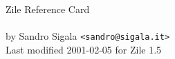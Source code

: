 \documentclass[10pt]{article}
\begin{document}
\pagestyle{empty}

\begin{center}
  \Large
  Zile Reference Card                                   \\
  \small\mbox{}                                         \\
  by Sandro Sigala \verb|<sandro@sigala.it>|            \\
  Last modified 2001-02-05 for Zile 1.5
\end{center}

\vfill

\newcommand{\reftable}[2]{
  \begin{tabular}{|l|l|}
    \hline
    \multicolumn{2}{|c|}{\textsc{#1}} \\
    \hline
    \hline
    #2
    \hline
  \end{tabular}}

\newcommand{\kbd}[1]{\texttt{#1}}
\newcommand{\key}[1]{\texttt{<#1>}}

\small
\end{document}
